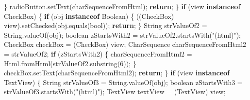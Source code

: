 \documentclass[
]{article}
\newenvironment{Shaded}{}{}
\newcommand{\BuiltInTok}[1]{\textcolor[rgb]{0.00,0.50,0.00}{#1}}
\newcommand{\ControlFlowTok}[1]{\textcolor[rgb]{0.00,0.44,0.13}{\textbf{#1}}}
\newcommand{\DataTypeTok}[1]{\textcolor[rgb]{0.56,0.13,0.00}{#1}}
\newcommand{\DecValTok}[1]{\textcolor[rgb]{0.25,0.63,0.44}{#1}}
\newcommand{\FunctionTok}[1]{\textcolor[rgb]{0.02,0.16,0.49}{#1}}
\newcommand{\KeywordTok}[1]{\textcolor[rgb]{0.00,0.44,0.13}{\textbf{#1}}}
\newcommand{\NormalTok}[1]{#1}
\newcommand{\OperatorTok}[1]{\textcolor[rgb]{0.40,0.40,0.40}{#1}}
\newcommand{\StringTok}[1]{\textcolor[rgb]{0.25,0.44,0.63}{#1}}
\begin{document}
\begin{Shaded}
\begin{Highlighting}[]
            \OperatorTok{\}}
\NormalTok{            radioButton}\OperatorTok{.}\FunctionTok{setText}\OperatorTok{(}\NormalTok{charSequenceFromHtml}\OperatorTok{);}
            \ControlFlowTok{return}\OperatorTok{;}
        \OperatorTok{\}}
        \ControlFlowTok{if} \OperatorTok{(}\NormalTok{view }\KeywordTok{instanceof}\NormalTok{ CheckBox}\OperatorTok{)} \OperatorTok{\{}
            \ControlFlowTok{if} \OperatorTok{(}\NormalTok{obj }\KeywordTok{instanceof} \BuiltInTok{Boolean}\OperatorTok{)} \OperatorTok{\{}
                \OperatorTok{((}\NormalTok{CheckBox}\OperatorTok{)}\NormalTok{ view}\OperatorTok{).}\FunctionTok{setChecked}\OperatorTok{(}\NormalTok{obj}\OperatorTok{.}\FunctionTok{equals}\OperatorTok{(}\NormalTok{bool}\OperatorTok{));}
                \ControlFlowTok{return}\OperatorTok{;}
            \OperatorTok{\}}
            \BuiltInTok{String}\NormalTok{ strValueOf2 }\OperatorTok{=} \BuiltInTok{String}\OperatorTok{.}\FunctionTok{valueOf}\OperatorTok{(}\NormalTok{obj}\OperatorTok{);}
            \DataTypeTok{boolean}\NormalTok{ zStartsWith2 }\OperatorTok{=}\NormalTok{ strValueOf2}\OperatorTok{.}\FunctionTok{startsWith}\OperatorTok{(}\StringTok{"(html)"}\OperatorTok{);}
\NormalTok{            CheckBox checkBox }\OperatorTok{=} \OperatorTok{(}\NormalTok{CheckBox}\OperatorTok{)}\NormalTok{ view}\OperatorTok{;}
            \BuiltInTok{CharSequence}\NormalTok{ charSequenceFromHtml2 }\OperatorTok{=}\NormalTok{ strValueOf2}\OperatorTok{;}
            \ControlFlowTok{if} \OperatorTok{(}\NormalTok{zStartsWith2}\OperatorTok{)} \OperatorTok{\{}
\NormalTok{                charSequenceFromHtml2 }\OperatorTok{=}\NormalTok{ Html}\OperatorTok{.}\FunctionTok{fromHtml}\OperatorTok{(}\NormalTok{strValueOf2}\OperatorTok{.}\FunctionTok{substring}\OperatorTok{(}\DecValTok{6}\OperatorTok{));}
            \OperatorTok{\}}
\NormalTok{            checkBox}\OperatorTok{.}\FunctionTok{setText}\OperatorTok{(}\NormalTok{charSequenceFromHtml2}\OperatorTok{);}
            \ControlFlowTok{return}\OperatorTok{;}
        \OperatorTok{\}}
        \ControlFlowTok{if} \OperatorTok{(}\NormalTok{view }\KeywordTok{instanceof}\NormalTok{ TextView}\OperatorTok{)} \OperatorTok{\{}
            \BuiltInTok{String}\NormalTok{ strValueOf3 }\OperatorTok{=} \BuiltInTok{String}\OperatorTok{.}\FunctionTok{valueOf}\OperatorTok{(}\NormalTok{obj}\OperatorTok{);}
            \DataTypeTok{boolean}\NormalTok{ zStartsWith3 }\OperatorTok{=}\NormalTok{ strValueOf3}\OperatorTok{.}\FunctionTok{startsWith}\OperatorTok{(}\StringTok{"(html)"}\OperatorTok{);}
\NormalTok{            TextView textView }\OperatorTok{=} \OperatorTok{(}\NormalTok{TextView}\OperatorTok{)}\NormalTok{ view}\OperatorTok{;}

\end{Highlighting}
\end{Shaded}
\end{document}
